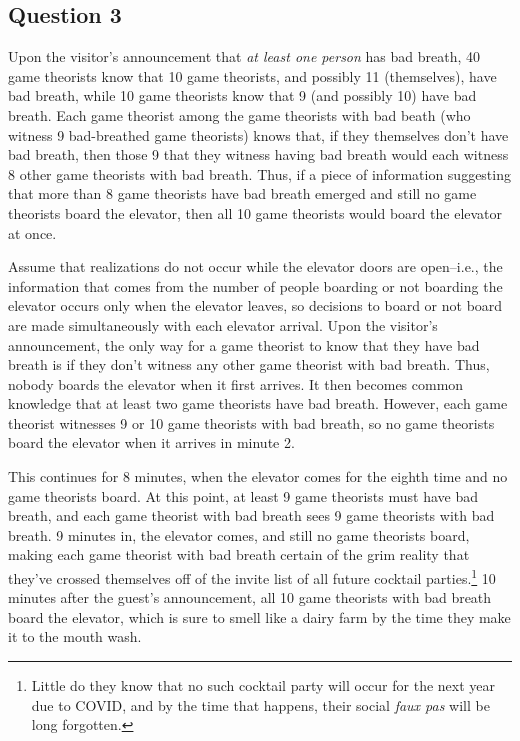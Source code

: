 \documentclass{article}
\begin{document}

\subsection*{Question 3}
Upon the visitor's announcement that \textit{at least one person} has bad breath, 40 game theorists know that 10 game theorists, and possibly 11 (themselves), have bad breath, while 10 game theorists know that 9 (and possibly 10) have bad breath. Each game theorist among the game theorists with bad beath (who witness 9 bad-breathed game theorists) knows that, if they themselves don't have bad breath, then those 9 that they witness having bad breath would each witness 8 other game theorists with bad breath. Thus, if a piece of information suggesting that more than 8 game theorists have bad breath emerged and still no game theorists board the elevator, then all 10 game theorists would board the elevator at once.

Assume that realizations do not occur while the elevator doors are open--i.e., the information that comes from the number of people boarding or not boarding the elevator occurs only when the elevator leaves, so decisions to board or not board are made simultaneously with each elevator arrival. Upon the visitor's announcement, the only way for a game theorist to know that they have bad breath is if they don't witness any other game theorist with bad breath. Thus, nobody boards the elevator when it first arrives. It then becomes common knowledge that at least two game theorists have bad breath. However, each game theorist witnesses 9 or 10 game theorists with bad breath, so no game theorists board the elevator when it arrives in minute 2. 

This continues for 8 minutes, when the elevator comes for the eighth time and no game theorists board. At this point, at least 9 game theorists must have bad breath, and each game theorist with bad breath sees 9 game theorists with bad breath. 9 minutes in, the elevator comes, and still no game theorists board, making each game theorist with bad breath certain of the grim reality that they've crossed themselves off of the invite list of all future cocktail parties.\footnote{Little do they know that no such cocktail party will occur for the next year due to COVID, and by the time that happens, their social \textit{faux pas} will be long forgotten.} 10 minutes after the guest's announcement, all 10 game theorists with bad breath board the elevator, which is sure to smell like a dairy farm by the time they make it to the mouth wash.
\end{document}
